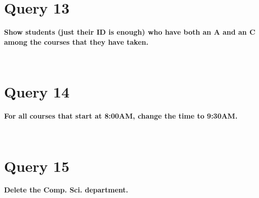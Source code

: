 \documentclass[letterpaper]{article}
\begin{document}
\section{Query 13}

    \textbf{Show students (just their ID is enough) who have both an A and an C among the courses that they have taken.}
    \begin{lstlisting}
        
    \end{lstlisting}
        
\section{Query 14}

    \textbf{For all courses that start at 8:00AM, change the time to 9:30AM.}
    \begin{lstlisting}
        
    \end{lstlisting}
        
\section{Query 15}

    \textbf{Delete the Comp. Sci. department.}
    \begin{lstlisting}
        
    \end{lstlisting}
\end{document}
